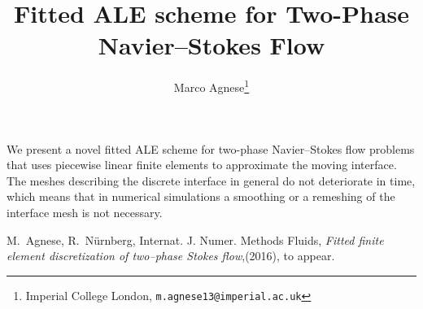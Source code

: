 \documentclass{article}
\begin{document}
\title{Fitted ALE scheme for Two-Phase Navier--Stokes Flow}
\author{%
  Marco Agnese\thanks{Imperial College London,
    \texttt{m.agnese13@imperial.ac.uk}}
}
\maketitle

We present a novel fitted ALE scheme for two-phase Navier--Stokes flow problems 
that uses piecewise linear finite elements to approximate the moving interface. 
The meshes describing the discrete interface in general do not deteriorate in 
time, which means that in numerical simulations a smoothing or a remeshing of 
the interface mesh is not necessary.
\begin{thebibliography}{10}

M.~Agnese, R.~N\"urnberg, Internat. J. Numer. Methods Fluids, 
\emph{ Fitted finite element discretization of two--phase Stokes flow},(2016), 
to appear.
\end{thebibliography}
\end{document}
